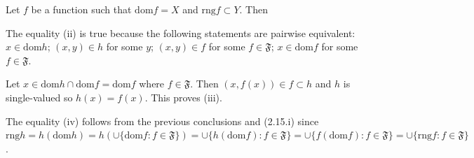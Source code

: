 Let $f$ be a function such that $\text{dom}f = X$ and $\text{rng}f \subset Y$. Then

The equality (ii) is true because the following statements are pairwise equivalent: $x \in \text{dom} h$; $(x, y) \in h$ for some $y$; $(x, y) \in f$ for some $f \in \mathfrak{F}$; $x \in \text{dom} f$ for some $f \in \mathfrak{F}$.

Let $x \in \text{dom} h \cap \text{dom} f = \text{dom} f$ where $f \in \mathfrak{F}$. Then $(x, f(x)) \in f \subset h$ and $h$ is single-valued so $h(x) = f(x)$. This proves (iii).

The equality (iv) follows from the previous conclusions and (2.15.i) since $\text{rng} h = h (\text{dom} h) = h (\cup \{ \text{dom} f : f \in \mathfrak{F} \}) = \cup \{ h (\text{dom} f) : f \in \mathfrak{F} \} = \cup \{ f (\text{dom} f) : f \in \mathfrak{F} \} = \cup \{ \text{rng} f : f \in \mathfrak{F} \}$.